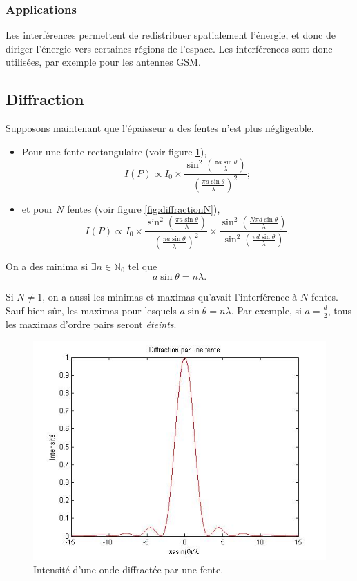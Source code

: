 \subsubsection{Applications}
Les interférences permettent de redistribuer spatialement l'énergie,
et donc de diriger l'énergie vers certaines régions de l'espace.
Les interférences sont donc utilisées, par exemple pour les antennes
GSM.


\subsection{Diffraction}
Supposons maintenant que l'épaisseur $a$ des fentes n'est plus
négligeable.
\begin{itemize}
  \item Pour une fente rectangulaire (voir figure \ref{fig:diffraction1}),
    \[ I(P) \propto I_0 \times
      \frac{\sin^2\left(\frac{\pi a \sin\theta}{\lambda}\right)}
    {\left(\frac{\pi a \sin\theta}{\lambda}\right)^2}; \]
  \item et pour $N$ fentes (voir figure \ref{fig:diffractionN}),
    \[ I(P) \propto I_0 \times
      \frac{\sin^2\left(\frac{\pi a \sin\theta}{\lambda}\right)}
      {\left(\frac{\pi a \sin\theta}{\lambda}\right)^2} \times
      \frac{\sin^2\left(\frac{N \pi d \sin\theta}{\lambda}\right)}
    {\sin^2\left(\frac{\pi d \sin\theta}{\lambda}\right)}. \]
\end{itemize}
On a des minima si $\exists n \in \mathbb{N}_0$ tel que
\[ a \sin \theta = n\lambda. \]

Si $N \neq 1$, on a aussi les minimas et maximas qu'avait
l'interférence à $N$ fentes.
Sauf bien sûr, les maximas pour lesquels $a\sin\theta = n\lambda$.
Par exemple, si $a = \frac{d}{2}$, tous les maximas d'ordre pairs
seront \emph{éteints}.

\begin{figure}[ht!]
	\centering
	\includegraphics[scale=0.6]{diffraction1.jpg}
	\caption{Intensité d'une onde diffractée par une fente.}
	\label{fig:diffraction1}
\end{figure}

